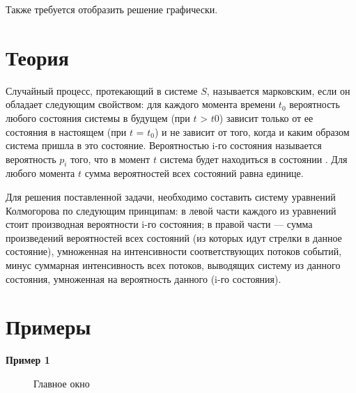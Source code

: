 \documentclass[14pt, a4paper]{extarticle}
\begin{document}
	Также требуется отобразить решение графически.
	
	\clearpage
	\section*{Теория}
	
	Случайный процесс, протекающий в системе $S$, называется марковским, если он обладает следующим свойством: для каждого момента времени $t_0$ вероятность любого состояния системы в будущем (при $t$ > $t0$) зависит только от ее состояния в настоящем (при $t$ = $t_0$) и не зависит от того, когда и каким образом система пришла в это состояние. Вероятностью i-го состояния называется вероятность $p_i$ того, что в момент $t$ система будет находиться в состоянии . Для любого момента $t$ сумма вероятностей всех состояний равна единице.
	
	Для решения поставленной задачи, необходимо составить систему уравнений Колмогорова по следующим принципам: в левой части каждого из уравнений стоит производная вероятности i-го состояния; в правой части — сумма произведений вероятностей всех состояний (из которых идут стрелки в данное состояние), умноженная на интенсивности соответствующих потоков событий, минус суммарная интенсивность всех потоков, выводящих систему из данного состояния, умноженная на вероятность данного (i-го состояния).
	
	\clearpage
	\section*{Примеры}
	
	\textbf{Пример 1}
	\begin{figure}[h!]
		\centering\caption{Главное окно}
	\end{figure}
\end{document}
